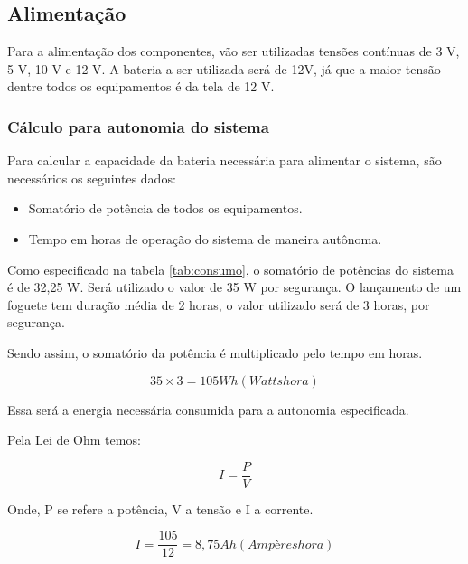 \subsection{Alimentação}
Para a alimentação dos componentes, vão ser utilizadas tensões contínuas de 3 V, 5 V, 10 V e 12 V. A bateria a ser utilizada será de 12V, já que a maior tensão dentre todos os equipamentos é da tela de 12 V.

\subsubsection{ Cálculo para autonomia do sistema}
    
Para calcular a capacidade da bateria necessária para alimentar o sistema, são necessários os seguintes dados:
    \begin{itemize}
        \item Somatório de potência de todos os equipamentos.
        \item Tempo em horas de operação do sistema de maneira autônoma.
    \end{itemize}

Como especificado na tabela \ref{tab:consumo}, o somatório de potências do sistema é de 32,25 W. Será utilizado o valor de 35 W por segurança. O lançamento de um foguete tem duração média de 2 horas, o valor utilizado será de 3 horas, por segurança.

Sendo assim, o somatório da potência é multiplicado pelo tempo em horas.

\begin{center}
\begin{equation}\label{m}
	35 \times 3 = 105 Wh (Watts hora) 
\end{equation}
\end{center}

Essa será a energia necessária consumida para a autonomia especificada.

Pela Lei de Ohm temos: 
\begin{center}
\begin{equation}
\label{Lei de Ohm}
 I = \frac{P} {V}
\end{equation}
\end{center}


Onde, P se refere a potência, V a tensão e I a corrente.
\begin{center}
\begin{equation}
 I = \frac{105} {12} = 8,75 Ah (Ampères hora)
\end{equation}
\end{center}


